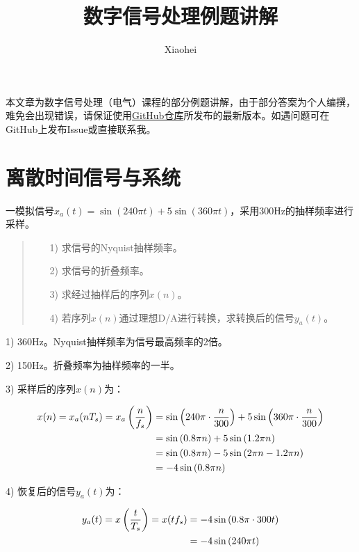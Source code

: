 \documentclass[cn, hazy, blue, normal, 14pt]{elegantnote}
\title{数字信号处理例题讲解}
\author{Xiaohei}
\date{\zhtoday}
\begin{document}
\maketitle

\setlength{\lineskip}{1.5em}
\setlength{\parskip}{0}


本文章为数字信号处理（电气）课程的部分例题讲解，由于部分答案为个人编撰，难免会出现错误，请保证使用\href{https://github.com/Moby-C/DigitalSignalProcessingNote}{GitHub仓库}所发布的最新版本。如遇问题可在GitHub上发布Issue或直接联系我。


\section{离散时间信号与系统}


\begin{exercise}

一模拟信号$x_a(t)=\sin(240\pi t)+5\sin(360\pi t)$，采用300Hz的抽样频率进行采样。

\begin{quote}
\begin{itemize}
    \item[1)] 求信号的Nyquist抽样频率。
    \item[2)] 求信号的折叠频率。
    \item[3)] 求经过抽样后的序列$x(n)$。
    \item[4)] 若序列$x(n)$通过理想D/A进行转换，求转换后的信号$y_a(t)$。
\end{itemize}
\end{quote}

\end{exercise}

\begin{solution}[print=true]

1) 360Hz。Nyquist抽样频率为信号最高频率的2倍。

2) 150Hz。折叠频率为抽样频率的一半。

3) 采样后的序列$x(n)$为：

\begin{equation}
\notag
\begin{aligned}
    x(n)=x_a(nT_s)=x_a\left(\frac{n}{f_s}\right)&=\sin\left(240\pi\cdot\frac{n}{300}\right)+5\sin\left(360\pi\cdot\frac{n}{300}\right) \\
    &=\sin\left(0.8\pi n\right)+5\sin\left(1.2\pi n\right) \\
    &=\sin\left(0.8\pi n\right)-5\sin\left(2\pi n-1.2\pi n\right) \\
    &=-4\sin\left(0.8\pi n\right)
\end{aligned}
\end{equation}

4) 恢复后的信号$y_a(t)$为：

\begin{equation}
\notag
\begin{aligned}
    y_a(t)=x\left(\frac{t}{T_s}\right)=x(tf_s)&=-4\sin\left(0.8\pi \cdot 300 t\right) \\
    &=-4\sin\left(240\pi t\right)
\end{aligned}
\end{equation}

\end{solution}
\end{document}
